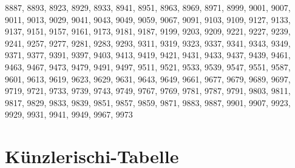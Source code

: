\documentclass[landscape,twocolumn,a4paper]{article}
\begin{document}
 8887,  8893,  8923,  8929,  8933,  8941,  8951,  8963,  8969,  8971,  8999,  9001,  9007,  9011,
 9013,  9029,  9041,  9043,  9049,  9059,  9067,  9091,  9103,  9109,  9127,  9133,  9137,  9151,
 9157,  9161,  9173,  9181,  9187,  9199,  9203,  9209,  9221,  9227,  9239,  9241,  9257,  9277,
 9281,  9283,  9293,  9311,  9319,  9323,  9337,  9341,  9343,  9349,  9371,  9377,  9391,  9397,
 9403,  9413,  9419,  9421,  9431,  9433,  9437,  9439,  9461,  9463,  9467,  9473,  9479,  9491,
 9497,  9511,  9521,  9533,  9539,  9547,  9551,  9587,  9601,  9613,  9619,  9623,  9629,  9631,
 9643,  9649,  9661,  9677,  9679,  9689,  9697,  9719,  9721,  9733,  9739,  9743,  9749,  9767,
 9769,  9781,  9787,  9791,  9803,  9811,  9817,  9829,  9833,  9839,  9851,  9857,  9859,  9871,
 9883,  9887,  9901,  9907,  9923,  9929,  9931,  9941,  9949,  9967,  9973
\section{Künzlerischi-Tabelle}
\end{document}
